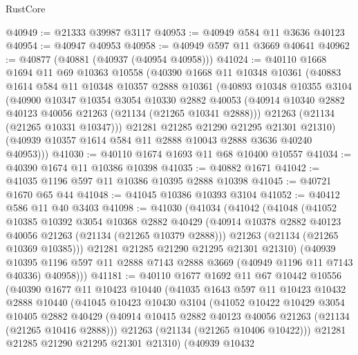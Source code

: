 \begin{lexlean}{RustCore}
\begin{coremodule}
@40949 := @21333 @39987 @3117
@40953 := @40949 @584 @11 @3636 @40123
@40954 := @40947 @40953
@40958 := @40949 @597 @11 @3669 @40641
@40962 := @40877 (@40881 (@40937 (@40954 @40958)))
@41024 := @40110
    @1668
    @1694
    @11
    @69
    @10363
    @10558
    (@40390
      @1668
      @11
      @10348
      @10361
      (@40883
        @1614
        @584
        @11
        @10348
        @10357
        @2888
        @10361
        (@40893
          @10348
          @10355
          @3104
          (@40900
            @10347
            @10354
            @3054
            @10330
            @2882
            @40053
            (@40914 @10340 @2882 @40123 @40056 @21263 (@21134 (@21265 @10341 @2888)))
            @21263
            (@21134 (@21265 @10331 @10347)))
          @21281
          @21285
          @21290
          @21295
          @21301
          @21310)
        (@40939 @10357 @1614 @584 @11 @2888 @10043 @2888 @3636 @40240 @40953)))
@41030 := @40110 @1674 @1693 @11 @68 @10400 @10557
@41034 := @40390 @1674 @11 @10386 @10398
@41035 := @40882 @1671
@41042 := @41035 @1196 @597 @11 @10386 @10395 @2888 @10398
@41045 := @40721 @1670 @65 @44
@41048 := @41045 @10386 @10393 @3104
@41052 := @40412 @586 @11 @40 @3403
@41098 := @41030
    (@41034
      (@41042
        (@41048
          (@41052
            @10385
            @10392
            @3054
            @10368
            @2882
            @40429
            (@40914 @10378 @2882 @40123 @40056 @21263 (@21134 (@21265 @10379 @2888)))
            @21263
            (@21134 (@21265 @10369 @10385)))
          @21281
          @21285
          @21290
          @21295
          @21301
          @21310)
        (@40939
          @10395
          @1196
          @597
          @11
          @2888
          @7143
          @2888
          @3669
          (@40949 @1196 @11 @7143 @40336)
          @40958)))
@41181 := @40110
    @1677
    @1692
    @11
    @67
    @10442
    @10556
    (@40390
      @1677
      @11
      @10423
      @10440
      (@41035
        @1643
        @597
        @11
        @10423
        @10432
        @2888
        @10440
        (@41045
          @10423
          @10430
          @3104
          (@41052
            @10422
            @10429
            @3054
            @10405
            @2882
            @40429
            (@40914 @10415 @2882 @40123 @40056 @21263 (@21134 (@21265 @10416 @2888)))
            @21263
            (@21134 (@21265 @10406 @10422)))
          @21281
          @21285
          @21290
          @21295
          @21301
          @21310)
        (@40939
          @10432

\end{coremodule}
\end{lexlean}
